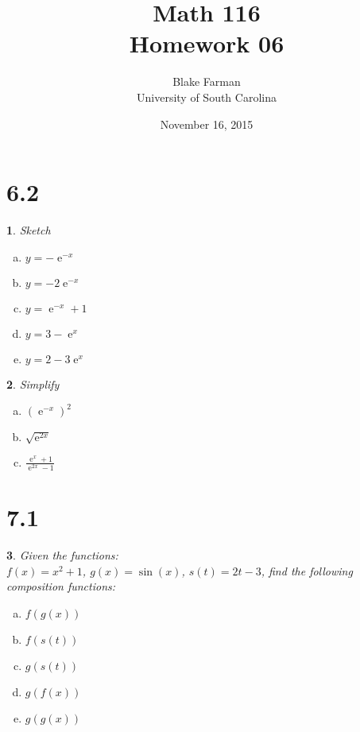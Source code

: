 \documentclass[12pt]{amsart}
\author{Blake Farman\\University of South Carolina}
\title{Math 116\\Homework 06}
\date{November 16, 2015}
\theoremstyle{plain}
\newtheorem{thm}{}
\begin{document}
\maketitle

\section*{6.2}
\renewcommand{\exp}[1]{\operatorname{e}^{#1}}

\setcounter{thm}{1}
\begin{thm}
  Sketch
  \begin{enumerate}[(a)]
  \item
    $\displaystyle{y = -\exp{-x}}$
  \item
    $\displaystyle{y = -2\exp{-x}}$
  \item
    $\displaystyle{y = \exp{-x} + 1}$
  \item
    $\displaystyle{y = 3 - \exp{x}}$
  \item
    $\displaystyle{y = 2 - 3\exp{x}}$
  \end{enumerate}
\end{thm}

\setcounter{thm}{5}

\begin{thm}
  Simplify
  \begin{enumerate}[(a)]
  \item
    $\displaystyle{\left(\exp{-x}\right)^2}$
  \item
    $\displaystyle{\sqrt{\exp{2x}}}$
  \item
    $\displaystyle{\frac{\exp{x} + 1}{\exp{2x} - 1}}$
  \end{enumerate}
\end{thm}

\newpage

\section*{7.1}

\setcounter{thm}{1}
\begin{thm}
  Given the functions:\\
  $f(x) = x^2 + 1$, $g(x) = \sin(x)$, $s(t) = 2t - 3$, find the following composition functions:
  \begin{enumerate}[(a)]
  \item
    $\displaystyle{f(g(x))}$
  \item
    $\displaystyle{f(s(t))}$
  \item
    $\displaystyle{g(s(t))}$
  \item
    $\displaystyle{g(f(x))}$
  \item
    $\displaystyle{g(g(x))}$
  \end{enumerate}
\end{thm}
\end{document}
